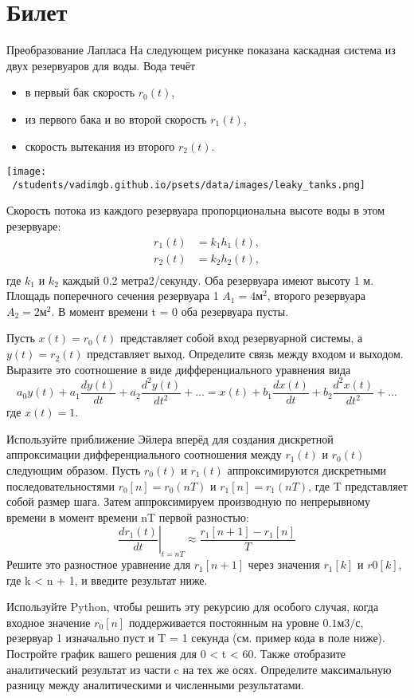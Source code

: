 \documentclass{exam}
\begin{document}
\section{Билет}
\begin{questions}
	\question 
Преобразование Лапласа 
	\question 
На следующем рисунке показана каскадная система 
из двух резервуаров для воды. Вода течёт
	\begin{itemize}
		\item в первый бак скорость \(r_0(t)\),
		\item из первого бака и во второй скорость \(r_1(t)\),
		\item скорость вытекания из второго \(r_2(t)\).
	\end{itemize}

	\texttt{[image: ~/students/vadimgb.github.io/psets/data/images/leaky\_tanks.png]}

Скорость потока из каждого резервуара пропорциональна 
высоте воды в этом резервуаре:
	\[
\begin{split}
r_1(t)&=k_1h_1(t),\\
r_2(t)&=k_2h_2(t),\\
\end{split}
\]
где \(k_1\) и \(k_2\) каждый 0.2 метра2/секунду.
Оба резервуара имеют высоту 1 м. 
Площадь поперечного сечения резервуара 1 \(A_1 = 4 м^2\), 
второго резервуара \(A_2 = 2 м^2\).
В момент времени t = 0 оба резервуара пусты.

Пусть \(x(t) = r_0 (t)\) представляет собой вход 
резервуарной системы, а \(y(t) = r_2 (t)\) представляет выход.
Определите связь между входом и выходом.
Выразите это соотношение в виде дифференциального уравнения вида
	\[
a_0y(t)+a_1\frac{dy(t)}{dt}+a_2\frac{d^2y(t)}{dt^2}+...=x(t)+b_1\frac{dx(t)}{dt}+b_2\frac{d^2x(t)}{dt^2}+...
\]
где \(x(t)=1\).



Используйте приближение Эйлера вперёд для создания 
дискретной аппроксимации дифференциального соотношения 
между \(r_1 (t)\) и \(r_0 (t)\) следующим образом.
Пусть \(r_0(t)\) и \(r_1 (t)\) аппроксимируются 
дискретными последовательностями \(r_0 [n] = r_0 (nT)\) 
и \(r_1 [n] = r_1 (nT)\), где T представляет собой размер шага.
Затем аппроксимируем производную по непрерывному времени 
в момент времени nT первой разностью:
	\[
\left. \frac{dr_1(t)}{dt}\right\vert_{t=nT}\approx \frac{r_1[n+1]-r_1[n]}{T}
\]
Решите это разностное уравнение для \(r_1 [n + 1]\) через 
значения \(r_1 [k]\) и \(r0 [k]\), где k < n + 1, 
и введите результат ниже.


Используйте Python, чтобы решить эту рекурсию для особого случая, 
когда входное значение \(r_0 [n]\) поддерживается постоянным 
на уровне \(0.1 м3/с\), резервуар 1 изначально пуст и
T = 1 секунда (см. пример кода в поле ниже).
Постройте график вашего решения для 0 < t < 60.
Также отобразите аналитический результат из части c на тех же осях.
Определите максимальную разницу между аналитическими и численными результатами.

\end{questions}
\vspace{15pt}
\end{document}

